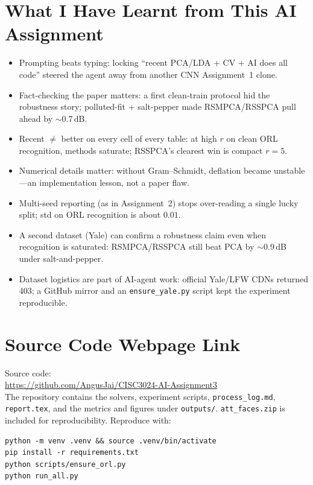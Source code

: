 \documentclass[11pt,a4paper]{article}
\begin{document}
\section{What I Have Learnt from This AI Assignment}
\begin{itemize}
  \item Prompting beats typing: locking ``recent PCA/LDA + CV + AI does all code'' steered the agent away from another CNN Assignment~1 clone.
  \item Fact-checking the paper matters: a first clean-train protocol hid the robustness story; polluted-fit + salt-pepper made RSMPCA/RSSPCA pull ahead by $\sim$0.7\,dB.
  \item Recent $\neq$ better on every cell of every table: at high $r$ on clean ORL recognition, methods saturate; RSSPCA's clearest win is compact $r{=}5$.
  \item Numerical details matter: without Gram--Schmidt, deflation became unstable---an implementation lesson, not a paper flaw.
  \item Multi-seed reporting (as in Assignment~2) stops over-reading a single lucky split; std on ORL recognition is about $0.01$.
  \item A second dataset (Yale) can confirm a robustness claim even when recognition is saturated: RSMPCA/RSSPCA still beat PCA by $\sim$0.9\,dB under salt-and-pepper.
  \item Dataset logistics are part of AI-agent work: official Yale/LFW CDNs returned 403; a GitHub mirror and an \texttt{ensure\_yale.py} script kept the experiment reproducible.
\end{itemize}

\section{Source Code Webpage Link}
Source code:\\[0.3em]
\url{https://github.com/AngusJai/CISC3024-AI-Assignment3}\\[0.3em]
The repository contains the solvers, experiment scripts, \texttt{process\_log.md}, \texttt{report.tex}, and the metrics and figures under \texttt{outputs/}.
\texttt{att\_faces.zip} is included for reproducibility.
Reproduce with:
\begin{verbatim}
python -m venv .venv && source .venv/bin/activate
pip install -r requirements.txt
python scripts/ensure_orl.py
python run_all.py
\end{verbatim}
\end{document}
